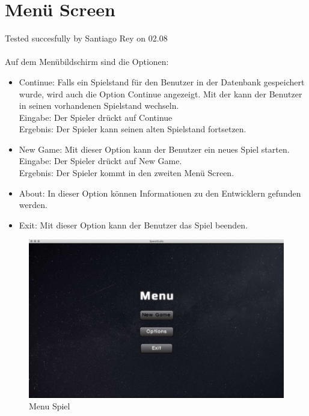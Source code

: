 \documentclass[12pt]{article}
\begin{document}
\section{Menü Screen}
Tested succesfully by Santiago Rey on 02.08\\\\
Auf dem Menübildschirm sind die Optionen:
\begin{itemize}
\item Continue: Falls ein Spielstand für den Benutzer in der Datenbank gespeichert wurde, wird auch die Option Continue angezeigt. Mit der kann der Benutzer in seinen vorhandenen Spielstand wechseln.\\
Eingabe: Der Spieler drückt auf Continue\\
Ergebnis: Der Spieler kann seinen alten Spielstand fortsetzen.\\
\item New Game: Mit dieser Option kann der Benutzer ein neues Spiel starten.\\
Eingabe: Der Spieler drückt auf New Game.\\
Ergebnis: Der Spieler kommt in den zweiten Menü Screen.\\
\item About: In dieser Option können Informationen zu den Entwicklern gefunden werden.
\item Exit: Mit dieser Option kann der Benutzer das Spiel beenden.
\end{itemize}
\begin{figure}[htp]
\centering
\includegraphics[scale=0.4]{TestProtocolBilder/menuScreen.jpg}
\caption{Menu Spiel}
\end{figure}
\newpage
\end{document}
